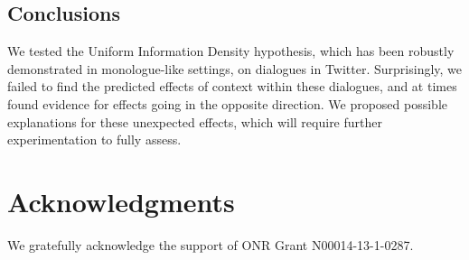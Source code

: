 \documentclass[11pt,letterpaper]{article}
\begin{document}
\subsection{Conclusions}

We tested the Uniform Information Density hypothesis, which has been robustly demonstrated in monologue-like settings, on dialogues in Twitter. Surprisingly, we failed to find the predicted effects of context within these dialogues, and at times found evidence for effects going in the opposite direction.  We proposed possible explanations for these unexpected effects, which will require further experimentation to fully assess.

\section*{Acknowledgments}

We gratefully acknowledge the support of ONR Grant N00014-13-1-0287.

\newpage


\end{document}
